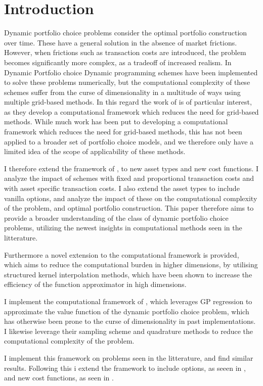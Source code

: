 \documentclass[11pt]{article}
\begin{document}
\fi

\section{Introduction}\label{sec:Introduction}

Dynamic portfolio choice problems consider the optimal portfolio construction over time.
These have a general solution in the absence of market frictions.
However, when frictions such as transaction costs are introduced, the problem becomes significantly more complex,
as a tradeoff of increased realism. 
In Dynamic Portfolio choice Dynamic programming schemes have been implemented to solve these problems numerically,
but the computational complexity of these schemes suffer from the curse of dimensionality
in a multitude of ways using multiple grid-based methods. In this regard the work of \textcite{Scheidegger2023} is of particular interest,
as they develop a computational framework which reduces the need for grid-based methods.
While much work has been put to developing a computational framework which reduces the need for grid-based methods,
this has not been applied to a broader set of portfolio choice models, 
and we therefore only have a limited idea of the scope of applicability of these methods.

I therefore extend the framework of \textcite{Scheidegger2023}, to new asset types and new cost functions.
I analyze the impact of schemes with fixed and proportional transaction costs and with asset specific transaction costs.
I also extend the asset types to include vanilla options, and analyze the impact of these on the computational complexity of the problem,
and optimal portfolio construction.
This paper therefore aims to provide a broader understanding of the class of dynamic portfolio choice problems,
utilizing the newest insights in computational methods seen in the litterature.

Furthermore a novel extension to the computational framework is provided, which aims to
reduce the computational burden in higher dimensions, by utilising structured kernel interpolation methods,
which have been shown to increase the efficiency of the function approximator in high dimensions.

I implement the computational framework of \textcite{Scheidegger2023}, which leverages
\ac{GP} regression to approximate the value function of the dynamic portfolio choice problem,
which has otherwise been prone to the curse of dimensionality in past implementations. 
I likewise leverage their sampling scheme and quadrature methods to reduce the computational complexity of the problem.

I implement this framework on problems seen in the litterature, and find similar results.
Following this i extend the framework to include options, as seeen in \textcite{CaiJuddXu2020},
and new cost functions, as seen in \textcite{Dybvig2020}.


\ifdefined\COMPILINGMAIN
\else
\printbibliography
\end{document}
